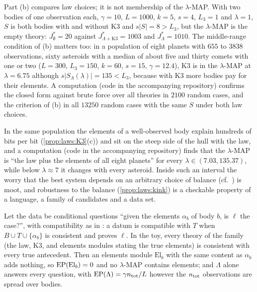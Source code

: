 Part (b) compares law choices; it is not membership of the $\lambda$-MAP. With two bodies of one observation each, $\gamma=10$, $L=1000$, $k=5$, $s=4$, $L_3=1$ and $\lambda=1$, $S$ is both bodies with and without $\mathrm{K3}$ and $s\lvert S\rvert=8>L_3$, but the $\lambda$-MAP is the empty theory: $J^*_\emptyset=20$ against $J^*_{\Lambda+\mathrm{K3}}=1003$ and $J^*_\Lambda=1010$. The middle-range condition of (b) matters too: in a population of eight planets with $655$ to $3838$ observations, sixty asteroids with a median of about five and thirty comets with one or two ($L=300$, $L_3=150$, $k=60$, $s=15$, $\gamma=12.4$), $\mathrm{K3}$ is in the $\lambda$-MAP at $\lambda=6.75$ although $s\lvert S_\Lambda(\lambda)\rvert=135<L_3$, because with $\mathrm{K3}$ more bodies pay for their elements. A computation (code in the accompanying repository) confirms the closed form against brute force over all theories in $2100$ random cases, and the criterion of (b) in all $13250$ random cases with the same $S$ under both law choices.

In the same population the elements of a well-observed body explain hundreds of bits per bit (\cref{prop:laws:K3}(c)) and sit on the steep side of the hull with the law, and a computation (code in the accompanying repository) finds that the $\lambda$-MAP is ``the law plus the elements of all eight planets'' for every $\lambda\in(7.03,135.37)$, while below $\lambda\approx7$ it changes with every asteroid. Inside such an interval the worry that the best system depends on an arbitrary choice of balance (cf.\ \citealp{woodward2014simplicity}) is moot, and robustness to the balance (\cref{prop:laws:kink}) is a checkable property of a language, a family of candidates and a data set.

\begin{proposition}\label{prop:laws:questions}
Let the data be conditional questions ``given the elements $\alpha_b$ of body $b$, is $\ell$ the case?'', with compatibility as in \Ethree: a datum is compatible with $T$ when $B\cup T\cup\{\alpha_b\}$ is consistent and proves $\ell$. In the toy, every theory of the family (the law, $\mathrm{K3}$, and elements modules stating the true elements) is consistent with every true antecedent. Then an elements module $\mathrm{El}_b$ with the same content as $\alpha_b$ adds nothing, so $\mathrm{EP}(\mathrm{El}_b)=0$ and no $\lambda$-MAP contains elements; and $\Lambda$ alone answers every question, with $\mathrm{EP}(\Lambda)=\gamma n_{\rm tot}/L$ however the $n_{\rm tot}$ observations are spread over bodies.
\end{proposition}

